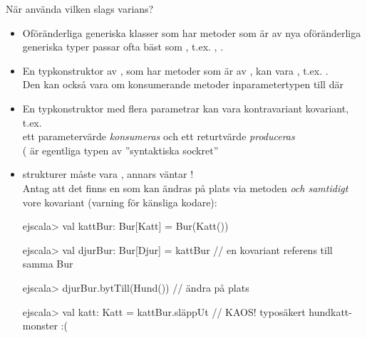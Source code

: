 \begin{Slide}{När använda vilken slags varians?}
\begin{itemize}\SlideFontTiny
\item Oföränderliga generiska klasser som har metoder som är  av nya oföränderliga generiska typer passar ofta bäst som , t.ex. ,  . 
\item En typkonstruktor av , som har metoder som är  av , kan vara , t.ex. . \\Den kan också vara  om konsumerande metoder  inparametertypen till  där 
\item En typkonstruktor med flera parametrar kan vara  kontravariant  kovariant, t.ex.  
\\ett parametervärde \emph{konsumeras} och ett returtvärde \emph{produceras}
\\( är egentliga typen av ''syntaktiska sockret'' 
\pause 
\item {} strukturer måste vara , annars väntar !\\
Antag att det finns en  som kan ändras på plats via metoden  \emph{och samtidigt} vore kovariant (varning för känsliga kodare): 
\begin{REPLsmall}
ejscala> val kattBur: Bur[Katt] = Bur(Katt())

ejscala> val djurBur: Bur[Djur] = kattBur  // en kovariant referens till samma Bur

ejscala> djurBur.bytTill(Hund())           // ändra på plats

ejscala> val katt: Katt = kattBur.släppUt  // KAOS! typosäkert hundkatt-monster :(
\end{REPLsmall}
\end{itemize}
\end{Slide}


